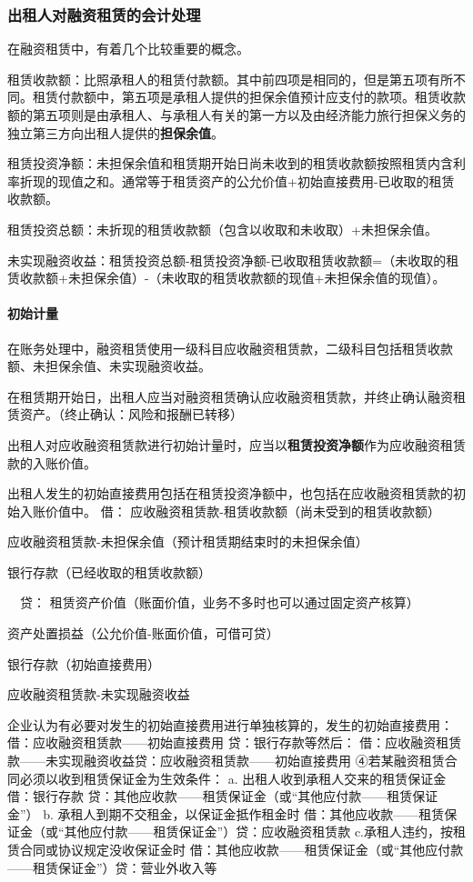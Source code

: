\documentclass[UTF8,12pt]{ctexart}
\newenvironment{Dr}{\noindent 借：}{\par}
\newenvironment{Cr}{\noindent \ \ 贷：}{\par}
\numberwithin{equation}{section} %
\numberwithin{figure}{section}
\numberwithin{table}{section}
\begin{document}
	\subsubsection{出租人对融资租赁的会计处理}
	在融资租赁中，有着几个比较重要的概念。
	
	租赁收款额：比照承租人的租赁付款额。其中前四项是相同的，但是第五项有所不同。租赁付款额中，第五项是承租人提供的担保余值预计应支付的款项。租赁收款额的第五项则是由承租人、与承租人有关的第一方以及由经济能力旅行担保义务的独立第三方向出租人提供的\textbf{担保余值}。
	
	租赁投资净额：未担保余值和租赁期开始日尚未收到的租赁收款额按照租赁内含利率折现的现值之和。通常等于租赁资产的公允价值+初始直接费用-已收取的租赁收款额。
	
	租赁投资总额：未折现的租赁收款额（包含以收取和未收取）+未担保余值。
	
	未实现融资收益：租赁投资总额-租赁投资净额-已收取租赁收款额=（未收取的租赁收款额+未担保余值）-（未收取的租赁收款额的现值+未担保余值的现值）。
	
	\paragraph{初始计量}在账务处理中，融资租赁使用一级科目应收融资租赁款，二级科目包括租赁收款额、未担保余值、未实现融资收益。
	
	在租赁期开始日，出租人应当对融资租赁确认应收融资租赁款，并终止确认融资租赁资产。（终止确认：风险和报酬已转移）
	
	出租人对应收融资租赁款进行初始计量时，应当以\textbf{租赁投资净额}作为应收融资租赁款的入账价值。
	
	出租人发生的初始直接费用包括在租赁投资净额中，也包括在应收融资租赁款的初始入账价值中。
	\begin{Dr}
		应收融资租赁款-租赁收款额（尚未受到的租赁收款额）
		
		应收融资租赁款-未担保余值（预计租赁期结束时的未担保余值）
		
		银行存款（已经收取的租赁收款额）
	\end{Dr}
	\begin{Cr}
		租赁资产价值（账面价值，业务不多时也可以通过固定资产核算）
		
		资产处置损益（公允价值-账面价值，可借可贷）
		
		银行存款（初始直接费用）
		
		应收融资租赁款-未实现融资收益
	\end{Cr}

	企业认为有必要对发生的初始直接费用进行单独核算的，发生的初始直接费用： 借：应收融资租赁款——初始直接费用
	贷：银行存款等然后：
	借：应收融资租赁款——未实现融资收益贷：应收融资租赁款——初始直接费用
	④若某融资租赁合同必须以收到租赁保证金为生效条件：
	a.	出租人收到承租人交来的租赁保证金借：银行存款
	贷：其他应收款——租赁保证金（或“其他应付款——租赁保证金”）
	b.	承租人到期不交租金，以保证金抵作租金时
	借：其他应收款——租赁保证金（或“其他应付款——租赁保证金”）贷：应收融资租赁款
	c.承租人违约，按租赁合同或协议规定没收保证金时
	借：其他应收款——租赁保证金（或“其他应付款——租赁保证金”）贷：营业外收入等
	
\end{document}
